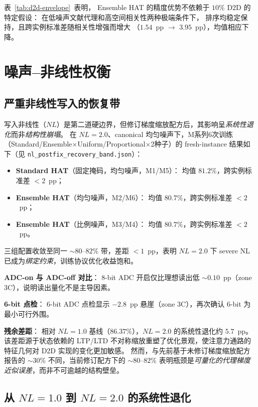 表~\ref{tab:d2d-envelope}~表明，
Ensemble HAT 的精度优势不依赖于 $10\%$ D2D 的特定假设：
在低噪声文献代理和高空间相关性两种极端条件下，
排序均稳定保持，且跨实例标准差随相关性增强而增大
（$1.54$~pp $\to$ $3.95$~pp），均值相应下降。


\section{噪声--非线性权衡}
\label{sec:noise-nl-tradeoff}

\subsection{严重非线性写入的恢复带}

写入非线性（$NL$）是第二道硬边界，但修订梯度缩放配方后，其影响呈\emph{系统性退化}而非\emph{结构性崩塌}。
在 $NL=2.0$、canonical 均匀噪声下，M系列6次训练（Standard/Ensemble$\times$Uniform/Proportional$\times$2种子）的 fresh-instance 结果如下（见 \texttt{nl\_postfix\_recovery\_band.json}）：

\begin{itemize}
    \item \textbf{Standard HAT}（固定掩码，均匀噪声，M1/M5）：
    均值 $\mathbf{81.2\%}$，跨实例标准差 $<2$~pp；
    \item \textbf{Ensemble HAT}（均匀噪声，M2/M6）：
    均值 $\mathbf{80.7\%}$，跨实例标准差 $<2$~pp；
    \item \textbf{Ensemble HAT}（比例噪声，M3/M4）：
    均值 $\mathbf{80.7\%}$，跨实例标准差 $<2$~pp。
\end{itemize}

三组配置收敛至同一 $\sim$$80$--$82\%$ 带，差距 $<1$~pp，表明 $NL=2.0$ 下 severe NL 已成为\emph{绑定约束}，训练协议优化收益饱和。

\textbf{ADC-on 与 ADC-off 对比}：
8-bit ADC 开启仅比理想读出低 $\sim$$0.10$~pp（zone 3C），说明读出量化不是主导因素。

\textbf{6-bit 点检}：
6-bit ADC 点检显示 $-2.8$~pp 悬崖（zone 3C），再次确认 6-bit 为最小可行外围。

\textbf{残余差距}：
相对 $NL=1.0$ 基线（$86.37\%$），$NL=2.0$ 的系统性退化约 $5.7$~pp。
该差距源于状态依赖的 LTP/LTD 不对称缩放重塑了优化景观，使注意力通路的特征几何对 D2D 实现的变化更加敏感。
然而，与先前基于未修订梯度缩放配方报告的 $\sim$$30\%$ 不同，当前修订配方下的 $\sim$$80$--$82\%$ 表明瓶颈是\emph{可量化的代理梯度近似误差}，而非不可逾越的结构壁垒。

\subsection{从 $NL=1.0$ 到 $NL=2.0$ 的系统性退化}

